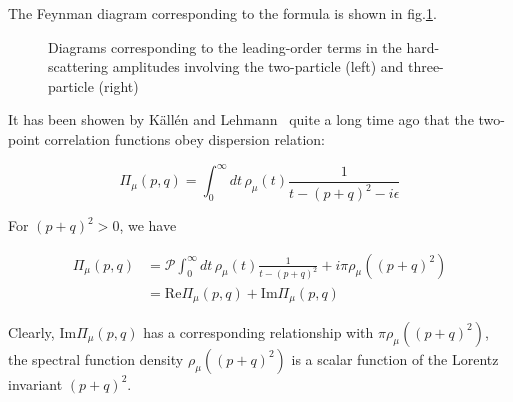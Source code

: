 The Feynman diagram corresponding to the formula is shown in fig.\ref{fig:feynman1}.

\begin{figure}[!hpt]\centering
    \caption{Diagrams corresponding to the leading-order terms in the hard-scattering amplitudes
        involving the two-particle (left) and three-particle (right)}
    \label{fig:feynman1}
\end{figure}

It has been showen by Källén and Lehmann~\cite{Kallen1952, Lehmann1954} quite a long time ago that the two-point correlation functions obey dispersion relation:

\begin{equation}
    \Pi_\mu(p, q)= \int_{0}^{\infty} dt\, \rho_{\mu}(t)\frac{1}{t-(p+q)^{2}-i\epsilon}
\end{equation}

For $(p+q)^{2}>0$, we have

\begin{equation}
    \begin{array}{rl}
        \Pi_\mu(p, q) & = \mathcal{P} \int_{0}^{\infty} dt\, \rho_{\mu}(t)\frac{1}{t-(p+q)^{2}} + i\pi\rho_{\mu}((p+q)^{2}) \\
                      & = \mathrm{Re}\Pi_\mu(p, q) + \mathrm{Im}\Pi_\mu(p, q)
    \end{array}
    \label{eq:dispersion_relation_real}
\end{equation}

Clearly, $\mathrm{Im}\Pi_\mu(p, q)$ has a corresponding relationship with $\pi\rho_{\mu}((p+q)^{2})$, the spectral function density $\rho_{\mu}((p+q)^{2})$ is a scalar function of the Lorentz invariant $(p+q)^{2}$.

